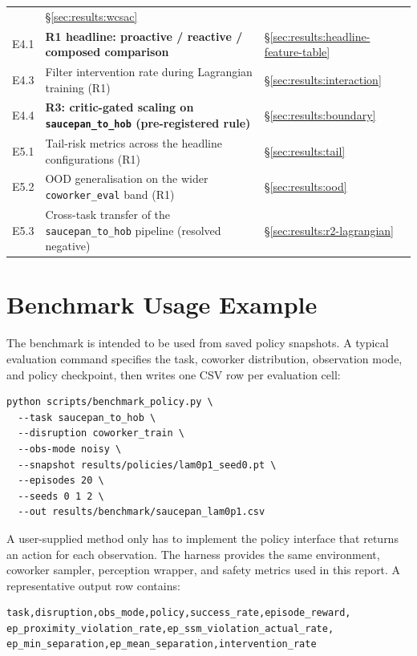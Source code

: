 \documentclass[11pt,a4paper]{report}
\begin{document}
\begin{table}[htbp]
\begin{tabular}{lll}
       & \S\ref{sec:results:wcsac} \\
E4.1   & \textbf{R1 headline: proactive / reactive / composed comparison}
       & \S\ref{sec:results:headline-feature-table} \\
E4.3   & Filter intervention rate during Lagrangian training (R1)
       & \S\ref{sec:results:interaction} \\
E4.4   & \textbf{R3: critic-gated scaling on \texttt{saucepan\_to\_hob} (pre-registered rule)}
       & \S\ref{sec:results:boundary} \\
E5.1   & Tail-risk metrics across the headline configurations (R1)
       & \S\ref{sec:results:tail} \\
E5.2   & OOD generalisation on the wider \texttt{coworker\_eval} band (R1)
       & \S\ref{sec:results:ood} \\
E5.3   & Cross-task transfer of the \texttt{saucepan\_to\_hob} pipeline (resolved negative)
       & \S\ref{sec:results:r2-lagrangian} \\
\bottomrule
\end{tabular}
\end{table}

\chapter{Benchmark Usage Example}
\label{app:benchmark-usage}

The benchmark is intended to be used from saved policy snapshots. A
typical evaluation command specifies the task, coworker distribution,
observation mode, and policy checkpoint, then writes one CSV row per
evaluation cell:

\begin{verbatim}
python scripts/benchmark_policy.py \
  --task saucepan_to_hob \
  --disruption coworker_train \
  --obs-mode noisy \
  --snapshot results/policies/lam0p1_seed0.pt \
  --episodes 20 \
  --seeds 0 1 2 \
  --out results/benchmark/saucepan_lam0p1.csv
\end{verbatim}

A user-supplied method only has to implement the policy interface that
returns an action for each observation. The harness provides the same
environment, coworker sampler, perception wrapper, and safety metrics
used in this report. A representative output row contains:

\begin{verbatim}
task,disruption,obs_mode,policy,success_rate,episode_reward,
ep_proximity_violation_rate,ep_ssm_violation_actual_rate,
ep_min_separation,ep_mean_separation,intervention_rate
\end{verbatim}
\end{document}
